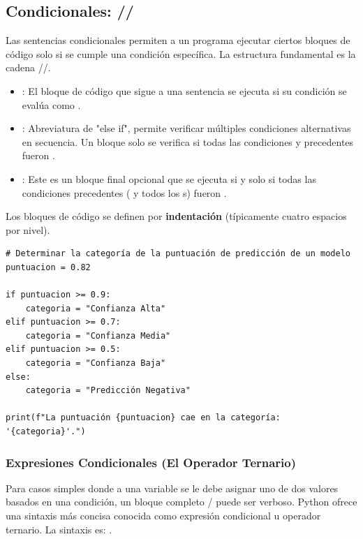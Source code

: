 \subsection{Condicionales: //}
\label{subsec:conditionals}
Las sentencias condicionales permiten a un programa ejecutar ciertos bloques de código solo si se cumple una condición específica. La estructura fundamental es la cadena //.

\begin{itemize}
    \item {}: El bloque de código que sigue a una sentencia  se ejecuta si su condición se evalúa como .
    \item {}: Abreviatura de "else if", permite verificar múltiples condiciones alternativas en secuencia. Un bloque  solo se verifica si todas las condiciones  y  precedentes fueron .
    \item {}: Este es un bloque final opcional que se ejecuta si y solo si todas las condiciones precedentes ( y todos los s) fueron .
\end{itemize}
Los bloques de código se definen por \textbf{indentación} (típicamente cuatro espacios por nivel).

\begin{example}\text{ }
\text{ }\begin{verbatim}
# Determinar la categoría de la puntuación de predicción de un modelo
puntuacion = 0.82

if puntuacion >= 0.9:
    categoria = "Confianza Alta"
elif puntuacion >= 0.7:
    categoria = "Confianza Media"
elif puntuacion >= 0.5:
    categoria = "Confianza Baja"
else:
    categoria = "Predicción Negativa"

print(f"La puntuación {puntuacion} cae en la categoría: '{categoria}'.")
\end{verbatim}
\end{example}

\subsubsection*{Expresiones Condicionales (El Operador Ternario)}
Para casos simples donde a una variable se le debe asignar uno de dos valores basados en una condición, un bloque completo / puede ser verboso. Python ofrece una sintaxis más concisa conocida como expresión condicional u operador ternario.
La sintaxis es: .

